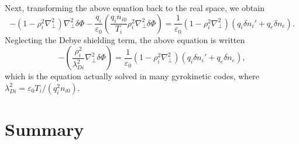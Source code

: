 \documentclass{llncs}
\begin{document}
Next, transforming the above equation back to the real space, we obtain
\begin{equation}
  - (1 - \rho_i^2 \nabla_{\perp}^2) \nabla_{\perp}^2 \delta \Phi -
  \frac{q_i}{\varepsilon_0} \left( \frac{q_i n_{i 0}}{T_i} \rho_i^2
  \nabla_{\perp}^2 \delta \Phi \right) = \frac{1}{\varepsilon_0} (1 - \rho_i^2
  \nabla_{\perp}^2) (q_i \delta n_i' + q_e \delta n_e) .
\end{equation}
Neglecting the Debye shielding term, the above equation is written
\begin{equation}
  - \left( \frac{\rho_i^2}{\lambda_{D i}^2} \nabla_{\perp}^2 \delta \Phi
  \right) = \frac{1}{\varepsilon_0} (1 - \rho_i^2 \nabla_{\perp}^2) (q_i
  \delta n_i' + q_e \delta n_e),
\end{equation}
which is the equation actually solved in many gyrokinetic codes, where
$\lambda_{D i}^2 = \varepsilon_0 T_i / (q_i^2 n_{i 0})$.

\section{Summary}
\end{document}
